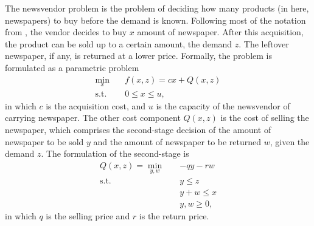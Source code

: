 \documentclass[12pt]{article}
\begin{document}
The newsvendor problem is the problem of deciding how many products (in here, newspapers) to buy before the demand is known.
Following most of the notation from \citet{birgeIntroductionStochasticProgramming2011}, the vendor decides to buy $x$ amount of newspaper. 
After this acquisition, the product can be sold up to a certain amount, the demand $z$.
The leftover newspaper, if any, is returned at a lower price.
Formally, the problem is formulated as a parametric problem
\begin{equation}\label{eq:deterministic-2sp-ul}
\begin{split}
    \min_{x} \quad & f(x,z) = c x + Q(x,z) \\
    \textrm{s.t.} \quad & 0\le x\le u
,\end{split}
\end{equation}
in which $c$ is the acquisition cost, and $u$ is the capacity of the newsvendor of carrying newspaper.
The other cost component $Q(x,z)$ is the cost of selling the newspaper, which comprises the second-stage decision of the amount of newspaper to be sold $y$ and the amount of newspaper to be returned $w$, given the demand $z$.
The formulation of the second-stage is
\begin{equation}\label{eq:deterministic-2sp-ll}
\begin{split}
    Q(x,z) = \min_{y,w} \quad & -q y - r w \\
    \textrm{s.t.} \quad & y\le z \\
      & y+w \le x \\
      & y,w \ge 0
,\end{split}
\end{equation}
in which $q$ is the selling price and $r$ is the return price.


\end{document}
